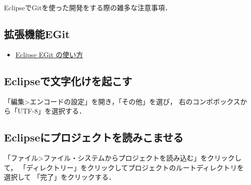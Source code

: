 EclipseでGitを使った開発をする際の雑多な注意事項．

\subsection{拡張機能EGit}\label{ux62e1ux5f35ux6a5fux80fdegit}

\begin{itemize}
\tightlist
\item
  \href{http://another.maple4ever.net/archives/2060/}{Eclipse EGit
  の使い方}
\end{itemize}

\subsection{Eclipseで文字化けを起こす}\label{eclipseux3067ux6587ux5b57ux5316ux3051ux3092ux8d77ux3053ux3059}

「編集\textgreater{}エンコードの設定」を開き，「その他」を選び，
右のコンボボックスから「UTF-8」を選択する．

\subsection{Eclipseにプロジェクトを読みこませる}\label{eclipseux306bux30d7ux30edux30b8ux30a7ux30afux30c8ux3092ux8aadux307fux3053ux307eux305bux308b}

「ファイル\textgreater{}ファイル・システムからプロジェクトを読み込む」をクリックして，
「ディレクトリー」をクリックしてプロジェクトのルートディレクトリを選択して
「完了」をクリックする．

